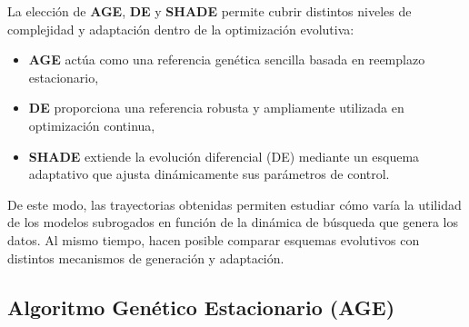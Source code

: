La elección de \textbf{AGE}, \textbf{DE} y \textbf{SHADE} permite cubrir distintos niveles de complejidad y adaptación dentro de la optimización evolutiva:

\begin{itemize}
    \item \textbf{AGE} actúa como una referencia genética sencilla basada en reemplazo estacionario,
    \item \textbf{DE} proporciona una referencia robusta y ampliamente utilizada en optimización continua,
    \item \textbf{SHADE} extiende la evolución diferencial (DE) mediante un esquema adaptativo que ajusta dinámicamente sus parámetros de control.
\end{itemize}

De este modo, las trayectorias obtenidas permiten estudiar cómo varía la utilidad de los modelos subrogados en función de la dinámica de búsqueda que genera los datos. Al mismo tiempo, hacen posible comparar esquemas evolutivos con distintos mecanismos de generación y adaptación.









\subsection{Algoritmo Genético Estacionario (AGE)}

